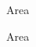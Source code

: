 \documentclass[a4paper]{article}
\begin{document}
\printVSLEventHeader{}{}
\begin{center}
\begin{vsltext}{3cm}{3.5cm}
Area \AreaA

\vspace{3cm}

Area \AreaC
\end{vsltext}

\end{center}
\end{document}
